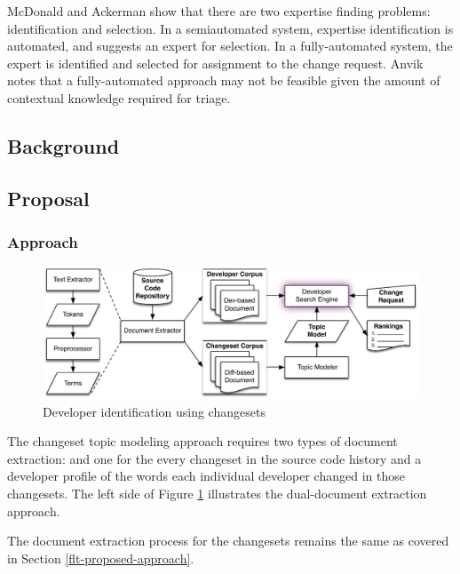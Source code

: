 \documentclass[12pt,draft]{Manuscript}
\begin{document}
\begin{body}
McDonald and Ackerman \citep{McDonald-Ackerman:1998} show that there are
two expertise finding problems: identification and selection. In a
semiautomated system, expertise identification is automated, and
suggests an expert for selection. In a fully-automated system, the
expert is identified and selected for assignment to the change request.
Anvik \citep{Anvik-etal:2006} notes that a fully-automated approach may
not be feasible given the amount of contextual knowledge required for
triage.

\subsection{Background}\label{triage-background}

\subsection{Proposal}\label{proposal-1}

\subsubsection{Approach}\label{approach-1}

\begin{figure}[htbp]
\centering
\includegraphics{figures/changeset-triage.pdf}
\caption{Developer identification using
changesets\label{fig:changeset-triage}}
\end{figure}

The changeset topic modeling approach requires two types of document
extraction: and one for the every changeset in the source code history
and a developer profile of the words each individual developer changed
in those changesets. The left side of Figure \ref{fig:changeset-triage}
illustrates the dual-document extraction approach.

The document extraction process for the changesets remains the same as
covered in Section \ref{flt-proposed-approach}.


\end{body}
\end{document}
